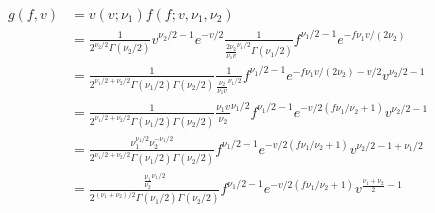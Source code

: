 \documentclass[a4paper]{article}
\begin{document}
\begin{align*}
g(f,v)
&= v(v; \nu_{1}) f(f; v, \nu_{1}, \nu_{2}) \\
&=  \frac{1}{2^{\nu_{2}/2}\Gamma(\nu_{2}/2)} v^{\nu_{2}/2-1} e^{-v/2} \frac{1}{\frac{2\nu_{2}}{\nu_{1}v}^{\nu_{1}/2}\Gamma(\nu_{1}/2)} f^{\nu_{1}/2-1} e^{-f\nu_{1}v/(2\nu_{2})} \\
&= \frac{1}{2^{\nu_{1}/2 + \nu_{2}/2}\Gamma(\nu_{1}/2)\Gamma(\nu_{2}/2)} \frac{1}{\frac{\nu_{2}}{\nu_{1}v}^{\nu_{1}/2}} f^{\nu_{1}/2-1} e^{-f\nu_{1}v/(2\nu_{2})-v/2} v^{\nu_{2}/2-1}  \\
&= \frac{1}{2^{\nu_{1}/2 + \nu_{2}/2}\Gamma(\nu_{1}/2)\Gamma(\nu_{2}/2)}{\frac{\nu_{1}v}{\nu_{2}}^{\nu_{1}/2}} f^{\nu_{1}/2-1} e^{-v/2(f\nu_{1}/\nu_{2} + 1)} v^{\nu_{2}/2-1}  \\
&= \frac{\nu_{1}^{\nu_{1}/2} \nu_{2}^{-\nu_{1}/2}}{2^{\nu_{1}/2 + \nu_{2}/2}\Gamma(\nu_{1}/2)\Gamma(\nu_{2}/2)} f^{\nu_{1}/2-1} e^{-v/2(f\nu_{1}/\nu_{2} + 1)} v^{\nu_{2}/2-1+\nu_{1}/2} \\
&= \frac{\frac{\nu_{1}}{\nu_{2}}^{\nu_{1}/2}}{2^{(\nu_{1} + \nu_{2})/2}\Gamma(\nu_{1}/2)\Gamma(\nu_{2}/2)} f^{\nu_{1}/2-1} e^{-v/2(f\nu_{1}/\nu_{2} + 1)} v^{\frac{\nu_{1} + \nu_{2}}{2}-1} \\
\end{align*}
\end{document}
